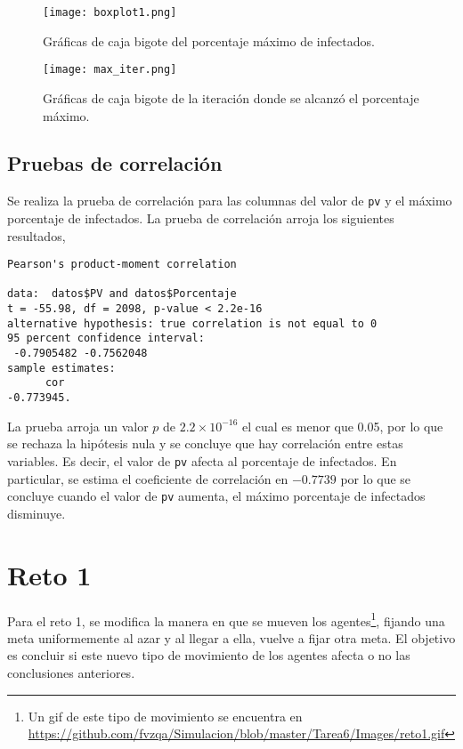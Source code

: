 \documentclass[12pt,letterpaper]{article}
\begin{document}
\begin{figure}
	\centering
	\texttt{[image: boxplot1.png]}
	\caption{Gráficas de caja bigote del porcentaje máximo de infectados.}
	\label{box1}
\end{figure}

\begin{figure}
	\centering
	\texttt{[image: max\_iter.png]}
	\caption{Gráficas de caja bigote de la iteración donde se alcanzó el porcentaje máximo.}
	\label{box2}
\end{figure}

\subsection{Pruebas de correlación}
Se realiza la prueba de correlación para las columnas del valor de \texttt{pv} y el máximo porcentaje de infectados. La prueba de correlación arroja los siguientes resultados,

\begin{verbatim}
Pearson's product-moment correlation

data:  datos$PV and datos$Porcentaje
t = -55.98, df = 2098, p-value < 2.2e-16
alternative hypothesis: true correlation is not equal to 0
95 percent confidence interval:
 -0.7905482 -0.7562048
sample estimates:
      cor 
-0.773945.
\end{verbatim}
La prueba arroja un valor $p$ de $2.2\times 10^{-16}$ el cual es menor que 0.05, por lo que se rechaza la hipótesis nula y se concluye que hay correlación entre estas variables. Es decir, el valor de \texttt{pv} afecta al porcentaje de infectados. En particular, se estima el coeficiente de correlación en $-0.7739$ por lo que se concluye cuando el valor de \texttt{pv} aumenta, el máximo porcentaje de infectados disminuye. 




\section{Reto 1}
Para el reto 1, se modifica la manera en que se mueven los agentes\footnote{Un gif de este tipo de movimiento se encuentra en \url{https://github.com/fvzqa/Simulacion/blob/master/Tarea6/Images/reto1.gif}}, fijando una meta uniformemente al azar y al llegar a ella, vuelve a fijar otra meta. El objetivo es concluir si este nuevo tipo de movimiento de los agentes afecta o no las conclusiones anteriores.
\end{document}
